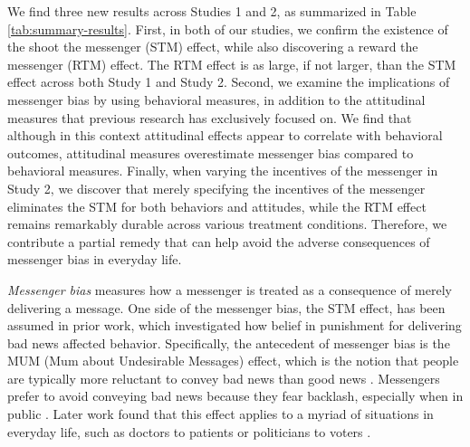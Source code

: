

We find three new results across Studies 1 and 2, as summarized in 
Table \ref{tab:summary-results}. First, in both of our
studies, we confirm the existence of the shoot the messenger (STM)
effect, while also discovering a reward the messenger (RTM) effect. The
RTM effect is as large, if not larger, than the STM effect across both
Study 1 and Study 2. Second, we examine the implications of
messenger bias by using behavioral measures, in addition to the
attitudinal measures that previous research has exclusively focused on.
We find that although in this context attitudinal effects appear to
correlate with behavioral outcomes, attitudinal measures overestimate
messenger bias compared to behavioral measures. Finally, when
varying the incentives of the messenger in Study 2, we discover that
merely specifying the incentives of the messenger eliminates the STM for
both behaviors and attitudes, while the RTM effect remains remarkably
durable across various treatment conditions. Therefore, we contribute a
partial remedy that can help avoid the adverse consequences of messenger
bias in everyday life.


\emph{Messenger bias} measures how a messenger is treated as a
consequence of merely delivering a message. One side of the messenger
bias, the STM effect, has been assumed in prior work, which investigated
how belief in punishment for delivering bad news affected behavior.
Specifically, the antecedent of messenger bias is the MUM (Mum about
Undesirable Messages) effect, which is the notion that people are
typically more reluctant to convey bad news than good news \citep{rosen1970reluctance,rosen1972fear}. 
Messengers prefer to avoid conveying bad news
because they fear backlash, especially when in public \citep{bond1987reluctance}.
 Later work found that this effect applies to a myriad
of situations in everyday life, such as doctors to patients \citep{clark1982death, sheldon1982truth, taylor1988telling}
 or politicians to voters \citep{dorling2002good,levy2014soothing}.


